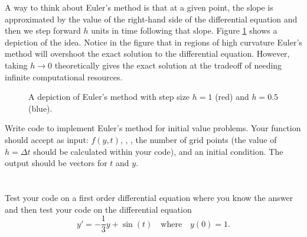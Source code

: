 A way to think about Euler's method is that at a given point, the slope is approximated by
the value of the right-hand side of the differential equation and then we step forward $h$
units in time following that slope.  Figure \ref{fig:Euler} shows a depiction of the idea.
Notice in the figure that in regions of high curvature Euler's method will overshoot the
exact solution to the differential equation.  However, taking $h \to 0$ theoretically
gives the exact solution at the tradeoff of needing infinite computational resources.

\begin{figure}[ht!]
    \begin{center}
    \end{center}
    \caption{A depiction of Euler's method with step size $h=1$ (red) and $h=0.5$ (blue).}
    \label{fig:Euler}
\end{figure}


\begin{problem}
    Write code to implement Euler's method for initial value problems.  Your \ProgLang
    function should accept as input: $f(y,t)$, , , the number of
    grid points (the value of $h = \Delta t$ should be calculated within your code), and
    an initial condition.  The output should be vectors for $t$ and $y$.\\
    \ifnum{}
     \\
    \else
     \\
    \fi
    Test your code on a first order differential equation where you know the answer and
    then test your code on the differential equation
    \[ y' = -\frac{1}{3}y+\sin(t) \quad \text{where} \quad y(0) = 1. \]
\end{problem}


